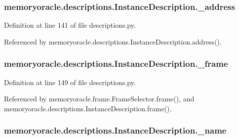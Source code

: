 \subsubsection[{\+\_\+address}]{\setlength{\rightskip}{0pt plus 5cm}memoryoracle.\+descriptions.\+Instance\+Description.\+\_\+address\hspace{0.3cm}{\ttfamily [private]}}\label{classmemoryoracle_1_1descriptions_1_1InstanceDescription_ac6750a694369f46d02e51af5341fb6c6}


Definition at line 141 of file descriptions.\+py.



Referenced by memoryoracle.\+descriptions.\+Instance\+Description.\+address().

\hypertarget{classmemoryoracle_1_1descriptions_1_1InstanceDescription_a73b12220373337079c5e3586525e2a01}{}
\subsubsection[{\+\_\+frame}]{\setlength{\rightskip}{0pt plus 5cm}memoryoracle.\+descriptions.\+Instance\+Description.\+\_\+frame\hspace{0.3cm}{\ttfamily [private]}}\label{classmemoryoracle_1_1descriptions_1_1InstanceDescription_a73b12220373337079c5e3586525e2a01}


Definition at line 149 of file descriptions.\+py.



Referenced by memoryoracle.\+frame.\+Frame\+Selector.\+frame(), and memoryoracle.\+descriptions.\+Instance\+Description.\+frame().

\hypertarget{classmemoryoracle_1_1descriptions_1_1InstanceDescription_a63e847dcd05fe43e43415bbff19cf32b}{}
\subsubsection[{\+\_\+name}]{\setlength{\rightskip}{0pt plus 5cm}memoryoracle.\+descriptions.\+Instance\+Description.\+\_\+name\hspace{0.3cm}{\ttfamily [private]}}\label{classmemoryoracle_1_1descriptions_1_1InstanceDescription_a63e847dcd05fe43e43415bbff19cf32b}



